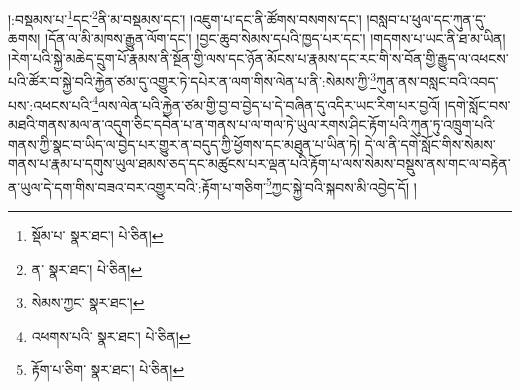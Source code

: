 །:བསྡམས་པ་\footnote{སྡོམ་པ་  སྣར་ཐང་།  པེ་ཅིན། }དང་\footnote{ན་  སྣར་ཐང་།  པེ་ཅིན། }ནི་མ་བསྡམས་དང་། །འཇུག་པ་དང་ནི་ཚོགས་བསགས་དང་། །བསླབ་པ་ཕུལ་དང་ཀུན་དུ་ཆགས། །དོན་ལ་མི་མཁས་རྒྱུན་ལོག་དང་། །བྱང་ཆུབ་སེམས་དཔའི་ཁྱད་པར་དང་། །གདགས་པ་ཡང་ནི་ཐ་མ་ཡིན། །རེག་པའི་སྐྱེ་མཆེད་དྲུག་པོ་རྣམས་ནི་སྔོན་གྱི་ལས་དང་ཉོན་མོངས་པ་རྣམས་དང་རང་གི་ས་བོན་གྱི་རྒྱུད་ལ་འཕངས་པའི་ཚོར་བ་སྐྱེ་བའི་རྐྱེན་ཙམ་དུ་འགྱུར་ཏེ་དཔེར་ན་ལག་གིས་ལེན་པ་ནི་:སེམས་ཀྱི་\footnote{སེམས་ཀྱང་  སྣར་ཐང་། }ཀུན་ནས་བསླང་བའི་འབད་པས་:འཕངས་པའི་\footnote{འཕགས་པའི་  སྣར་ཐང་།  པེ་ཅིན། }ལས་ལེན་པའི་རྐྱེན་ཙམ་གྱི་བྱ་བ་བྱེད་པ་དེ་བཞིན་དུ་འདིར་ཡང་རིག་པར་བྱའོ། །དགེ་སློང་བས་མཐའི་གནས་མལ་ན་འདུག་ཅིང་དབེན་པ་ན་གནས་པ་ལ་གལ་ཏེ་ཡུལ་རགས་ཤིང་རྟོག་པའི་ཀུན་ཏུ་འཁྲུག་པའི་གནས་ཀྱི་སྣང་བ་ཡིད་ལ་བྱེད་པར་གྱུར་ན་བདུད་ཀྱི་ཕྱོགས་དང་མཐུན་པ་ཡིན་ཏེ། དེ་ལ་ནི་དགེ་སློང་གིས་སེམས་གནས་པ་རྣམ་པ་དགུས་ཡུལ་ཐམས་ཅད་དང་མཚུངས་པར་ལྡན་པའི་རྟོག་པ་ལས་སེམས་བསྡུས་ནས་གང་ལ་བརྟེན་ན་ཡུལ་དེ་དག་གིས་བཟའ་བར་འགྱུར་བའི་:རྟོག་པ་གཅིག་\footnote{རྟོག་པ་ཅིག་  སྣར་ཐང་།  པེ་ཅིན། }ཀྱང་སྐྱེ་བའི་སྐབས་མི་འབྱེད་དོ། །
